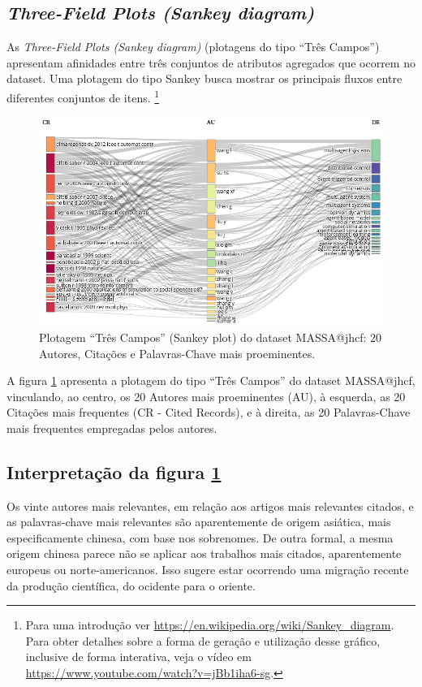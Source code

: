 \subsection{\textit{Three-Field Plots (Sankey diagram)}}

As \textit{Three-Field Plots (Sankey diagram)} (plotagens do tipo ``Três Campos'') apresentam afinidades entre três conjuntos de atributos agregados que ocorrem no dataset. Uma plotagem do tipo Sankey busca mostrar os principais fluxos entre diferentes conjuntos de itens. \footnote{Para uma introdução ver \url{https://en.wikipedia.org/wiki/Sankey_diagram}. Para obter detalhes sobre a forma de geração e utilização desse gráfico, inclusive de forma interativa, veja o vídeo em \url{https://www.youtube.com/watch?v=jBb1iha6-sg}.} 

\begin{figure}
    \centering
    \includegraphics[angle=0,width=1\textwidth]{experiments/jhcf/PesqBibliogr/SimulacaoMultiagente/WoS-20210803/classico-mais-citacoes/Dataset/ThreeFieldPlot-AU-CR-DE-20-20-20.png}
    \caption{Plotagem ``Três Campos'' (Sankey plot) do dataset MASSA@jhcf: 20 Autores, Citações e Palavras-Chave mais proeminentes.}
    \label{fig:MASSA@jhcf:ThreeFieldPlot}
\end{figure}

A figura \ref{fig:MASSA@jhcf:ThreeFieldPlot} apresenta a plotagem do tipo ``Três Campos'' do dataset MASSA@jhcf, vinculando, ao centro, os 20 Autores mais proeminentes (AU), à esquerda, as 20 Citações mais frequentes (CR - Cited Records), e à direita, as 20 Palavras-Chave mais frequentes empregadas pelos autores.

\subsection{Interpretação da figura \ref{fig:MASSA@jhcf:ThreeFieldPlot}}
Os vinte autores mais relevantes, em relação aos artigos mais relevantes citados, e as palavras-chave mais relevantes são aparentemente de origem asiática, mais especificamente chinesa, com base nos sobrenomes. De outra formal, a mesma origem chinesa parece não se aplicar aos trabalhos mais citados, aparentemente europeus ou norte-americanos. Isso sugere estar ocorrendo uma migração recente da produção científica, do ocidente para o oriente. 

